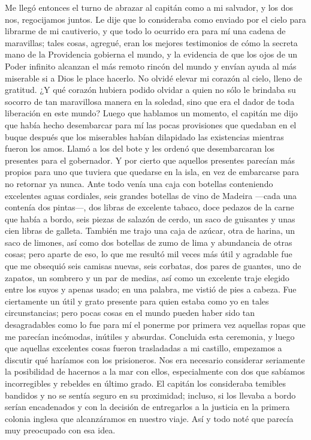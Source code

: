 \documentclass{novela}
\begin{document}
    Me llegó entonces el turno de abrazar al capitán como a mi salvador, y los dos nos, regocijamos juntos. Le dije que lo consideraba como enviado por el cielo para librarme de mi cautiverio, y que todo lo ocurrido era para mí una cadena de maravillas; tales cosas, agregué, eran los mejores testimonios de cómo la secreta mano de la Providencia gobierna el mundo, y la evidencia de que los ojos de un Poder infinito alcanzan el más remoto rincón del mundo y envían ayuda al más miserable si a Dios le place hacerlo.
    No olvidé elevar mi corazón al cielo, lleno de gratitud. ¿Y qué corazón hubiera podido olvidar a quien no sólo le brindaba su socorro de tan maravillosa manera en la soledad, sino que era el dador de toda liberación en este mundo?
    Luego que hablamos un momento, el capitán me dijo que había hecho desembarcar para mí las pocas provisiones que quedaban en el buque después que los miserables habían dilapidado las existencias mientras fueron los amos. Llamó a los del bote y les ordenó que desembarcaran los presentes para el gobernador. Y por cierto que aquellos presentes parecían más propios para uno que tuviera que quedarse en la isla, en vez de embarcarse para no retornar ya nunca.
    Ante todo venía una caja con botellas conteniendo excelentes aguas cordiales, seis grandes botellas de vino de Madeira —cada una contenía dos pintas—, dos libras de excelente tabaco, doce pedazos de la carne que había a bordo, seis piezas de salazón de cerdo, un saco de guisantes y unas cien libras de galleta.
    También me trajo una caja de azúcar, otra de harina, un saco de limones, así como dos botellas de zumo de lima y abundancia de otras cosas; pero aparte de eso, lo que me resultó mil veces más útil y agradable fue que me obsequió seis camisas nuevas, seis corbatas, dos pares de guantes, uno de zapatos, un sombrero y un par de medias, así como un excelente traje elegido entre los suyos y apenas usado; en una palabra, me vistió de pies a cabeza.
    Fue ciertamente un útil y grato presente para quien estaba como yo en tales circunstancias; pero pocas cosas en el mundo pueden haber sido tan desagradables como lo fue para mí el ponerme por primera vez aquellas ropas que me parecían incómodas, inútiles y absurdas.
    Concluida esta ceremonia, y luego que aquellas excelentes cosas fueron trasladadas a mi castillo, empezamos a discutir qué haríamos con los prisioneros. Nos era necesario considerar seriamente la posibilidad de hacernos a la mar con ellos, especialmente con dos que sabíamos incorregibles y rebeldes en último grado. El capitán los consideraba temibles bandidos y no se sentía seguro en su proximidad; incluso, si los llevaba a bordo serían encadenados y con la decisión de entregarlos a la justicia en la primera colonia inglesa que alcanzáramos en nuestro viaje. Así y todo noté que parecía muy preocupado con esa idea.
\end{document}
